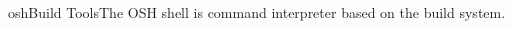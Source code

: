 %
%
%
\begin{Name}{1}{osh}{\authors}{Build Tools}{The OSH shell}
   is command interpreter based on the 
  build system.
\end{Name}

